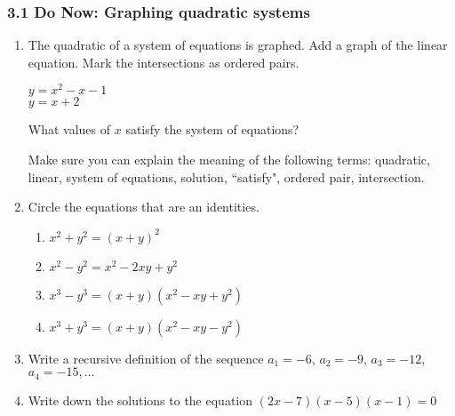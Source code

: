 \documentclass[12pt, twoside]{article}
\begin{document}
\subsubsection*{3.1 Do Now: Graphing quadratic systems}
\begin{enumerate}
  \item The quadratic of a system of equations is graphed. Add a graph of the linear equation. Mark the intersections as ordered pairs.

  \begin{multicols}{2}
    $y = x^2 - x - 1$ \\
    \columnbreak
    $y = x + 2$
    \end{multicols}
    What values of $x$ satisfy the system of equations? \vspace{2cm}

  \begin{center}
  \end{center}
Make sure you can explain the meaning of the following terms: quadratic, linear, system of equations, solution, ``satisfy", ordered pair, intersection.

\newpage
\item Circle the equations that are an identities.
    \begin{multicols}{2}
      \begin{enumerate}
        \item \(x^2 + y^2 = (x + y)^2\)
        \item \(x^2 - y^2 = x^2 - 2xy + y^2\)
        \item \(x^3 - y^3 = (x + y)(x^2 - xy + y^2)\)
        \item \(x^3 + y^3 = (x + y)(x^2 - xy - y^2)\)
      \end{enumerate}
    \end{multicols}

\item Write a recursive definition of the sequence $a_1 = -6$, $a_2 = -9$, $a_3 = -12$, $a_4 = -15, \ldots$ \vspace{2cm}
    
\item Write down the solutions to the equation $(2x-7)(x - 5)(x - 1) = 0$ \vspace{2cm}


\end{enumerate}
\end{document}
